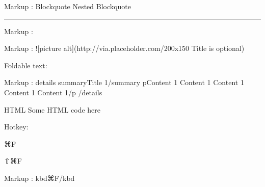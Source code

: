 \documentclass[letterpaper,10pt,english]{sphinxmanual}
\begin{document}
\begin{sphinxVerbatim}[commandchars=\\\{\}]
Markup :  \PYGZgt{} Blockquote
          \PYGZgt{}\PYGZgt{} Nested Blockquote
\end{sphinxVerbatim}

\sphinxAtStartPar
{}


\bigskip\hrule\bigskip


\begin{sphinxVerbatim}[commandchars=\\\{\}]
Markup :  \PYGZhy{} \PYGZhy{} \PYGZhy{} \PYGZhy{}
\end{sphinxVerbatim}

\sphinxAtStartPar
{}

\sphinxAtStartPar


\begin{sphinxVerbatim}[commandchars=\\\{\}]
Markup : ![picture alt](http://via.placeholder.com/200x150 \PYGZdq{}Title is optional\PYGZdq{})
\end{sphinxVerbatim}

\sphinxAtStartPar
Foldable text:



\begin{sphinxVerbatim}[commandchars=\\\{\}]
Markup : \PYGZlt{}details\PYGZgt{}
           \PYGZlt{}summary\PYGZgt{}Title 1\PYGZlt{}/summary\PYGZgt{}
           \PYGZlt{}p\PYGZgt{}Content 1 Content 1 Content 1 Content 1 Content 1\PYGZlt{}/p\PYGZgt{}
         \PYGZlt{}/details\PYGZgt{}
\end{sphinxVerbatim}

\begin{sphinxVerbatim}[commandchars=\\\{\}]
HTML
 Some HTML code here 
\end{sphinxVerbatim}

\sphinxAtStartPar
Hotkey:

\sphinxAtStartPar
⌘F

\sphinxAtStartPar
⇧⌘F

\begin{sphinxVerbatim}[commandchars=\\\{\}]
Markup : \PYGZlt{}kbd\PYGZgt{}⌘F\PYGZlt{}/kbd\PYGZgt{}
\end{sphinxVerbatim}
\end{document}
